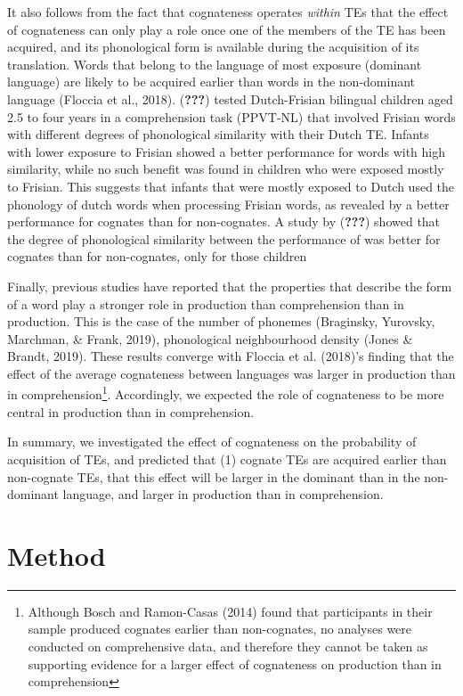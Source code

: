 \documentclass[
  english,
  man,man,floatsintext]{apa6}
\begin{document}
It also follows from the fact that cognateness operates \emph{within} TEs that the effect of cognateness can only play a role once one of the members of the TE has been acquired, and its phonological form is available during the acquisition of its translation. Words that belong to the language of most exposure (dominant language) are likely to be acquired earlier than words in the non-dominant language (Floccia et al., 2018). ({\textbf{???}}) tested Dutch-Frisian bilingual children aged 2.5 to four years in a comprehension task (PPVT-NL) that involved Frisian words with different degrees of phonological similarity with their Dutch TE. Infants with lower exposure to Frisian showed a better performance for words with high similarity, while no such benefit was found in children who were exposed mostly to Frisian. This suggests that infants that were mostly exposed to Dutch used the phonology of dutch words when processing Frisian words, as revealed by a better performance for cognates than for non-cognates.
A study by ({\textbf{???}}) showed that the degree of phonological similarity between
the performance of was better for cognates than for non-cognates, only for those children

Finally, previous studies have reported that the properties that describe the form of a word play a stronger role in production than comprehension than in production. This is the case of the number of phonemes (Braginsky, Yurovsky, Marchman, \& Frank, 2019), phonological neighbourhood density (Jones \& Brandt, 2019). These results converge with Floccia et al. (2018)'s finding that the effect of the average cognateness between languages was larger in production than in comprehension\footnote{Although Bosch and Ramon-Casas (2014) found that participants in their sample produced cognates earlier than non-cognates, no analyses were conducted on comprehensive data, and therefore they cannot be taken as supporting evidence for a larger effect of cognateness on production than in comprehension}. Accordingly, we expected the role of cognateness to be more central in production than in comprehension.

In summary, we investigated the effect of cognateness on the probability of acquisition of TEs, and predicted that (1) cognate TEs are acquired earlier than non-cognate TEs, that this effect will be larger in the dominant than in the non-dominant language, and larger in production than in comprehension.

\hypertarget{method}{%
\section{Method}\label{method}}
\end{document}
